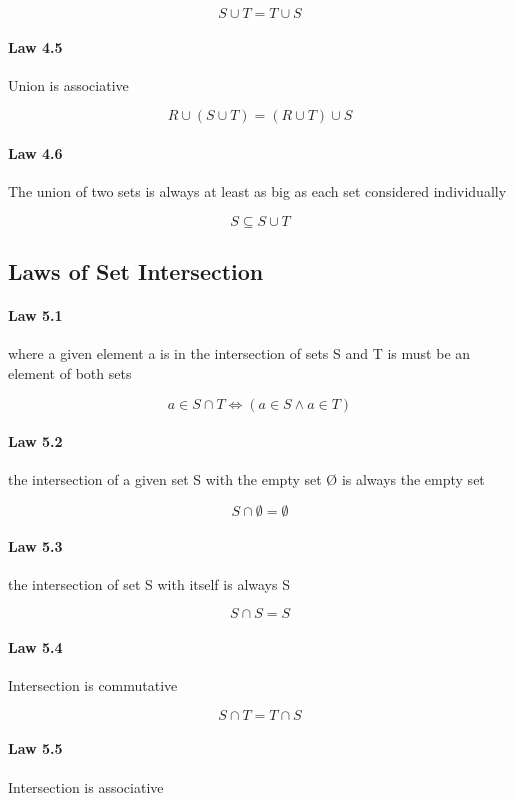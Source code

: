 \documentclass[twocolumn]{article}
\begin{document}
$$ S \cup T=T \cup S $$

\paragraph{Law 4.5} Union is associative

$$ R  \cup  (S  \cup  T) = (R  \cup  T)  \cup  S $$

\paragraph{Law 4.6} The union of two sets is always at least as big as each set considered individually

$$ S  \subseteq  S \cup T $$

\subsection{Laws of Set Intersection}

\paragraph{Law 5.1} where a given element a is in the intersection of sets S and T is must be an element of both sets

$$ a  \in  S  \cap  T \iff (a  \in  S \wedge a  \in  T) $$

\paragraph{Law 5.2} the intersection of a given set S with the empty set Ø is always the empty set

$$ S \cap  \emptyset = \emptyset  $$

\paragraph{Law 5.3} the intersection of set S with itself is always S

$$ S \cap S = S $$

\paragraph{Law 5.4} Intersection is commutative

$$ S \cap T=T \cap S $$

\paragraph{Law 5.5} Intersection is associative
\end{document}
